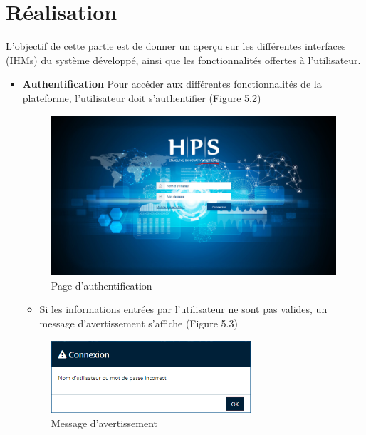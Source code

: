\section{Réalisation}
L’objectif de cette partie est de donner un aperçu sur les différentes interfaces (IHMs) du système développé, ainsi que les fonctionnalités offertes à l’utilisateur.

\begin{itemize}[label=\textbullet]
\item \textbf{Authentification}
Pour accéder aux différentes fonctionnalités de la plateforme, l’utilisateur doit s’authentifier (Figure 5.2)
\begin{figure}[h!]  
 \centering
    \includegraphics[width=1\textwidth]{chapitre5/Figures/cnx.png}
  \caption{Page d’authentification}
\end{figure}

\begin{itemize}
\item Si les informations entrées par l’utilisateur ne sont pas valides, un message d’avertissement s’affiche (Figure 5.3)
\end{itemize}
\newpage
\begin{figure}[h!]  
 \centering
    \includegraphics[width=0.7\textwidth]{chapitre5/Figures/errorcnx.png}
  \caption{Message d'avertissement}
\end{figure}


\end{itemize}

